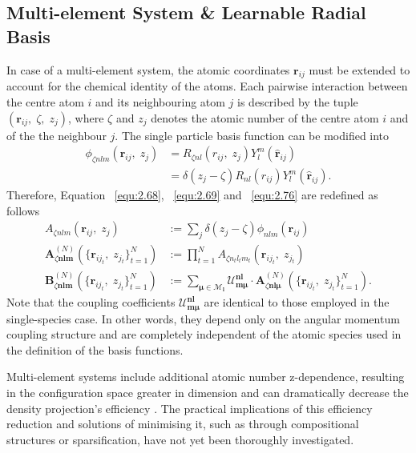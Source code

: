 \subsection{Multi-element System \& Learnable Radial Basis} \label{sec:2.5.5}
In case of a multi-element system, the atomic coordinates $\mathbf{r}_{ij}$ must be extended to account for the chemical identity of the atoms.
Each pairwise interaction between the centre atom $i$ and its neighbouring atom $j$ is described by the tuple $(\mathbf{r}_{ij},\;\zeta,\;z_{j})$, where $\zeta$ and $z_{j}$ denotes the atomic number of the centre atom $i$ and of the the neighbour $j$.
The single particle basis function can be modified into 
\begin{equation} \label{equ:2.79}
\begin{split}
\phi_{\zeta nlm}(\textbf{r}_{ij},\;z_{j})
&= R_{\zeta nl}(r_{ij},\;z_{j})Y_{l}^{m}(\hat{\textbf{r}}_{ij}) \\
&= \delta(z_{j}-\zeta)R_{nl}(r_{ij})Y_{l}^{m}(\hat{\textbf{r}}_{ij}).
\end{split}
\end{equation}
Therefore, Equation ~\eqref{equ:2.68}, ~\eqref{equ:2.69} and ~\eqref{equ:2.76} are redefined as follows
\begin{equation} \label{equ:2.80}
\begin{split}
    A_{\zeta nlm}(\textbf{r}_{ij},\;z_{j}) 
    &:=\sum_{j}\delta(z_{j}-\zeta)\phi_{nlm}(\textbf{r}_{ij})
\\
    \textbf{A}^{(N)}_{\zeta\mathbf{nlm}}(\{\mathbf{r}_{ij_{t}},\;z_{j_{t}}\}^{N}_{t=1})
    &:=\prod_{t=1}^{N}A_{\zeta n_{t}l_{t}m_{t}}(\mathbf{r}_{ij_{t}},\;z_{j_{t}}) 
\\
    \textbf{B}^{(N)}_{\zeta\mathbf{nlm}}(\{\mathbf{r}_{ij_{t}},\;z_{j_{t}}\}^{N}_{t=1}) 
    &:=\sum_{\boldsymbol{\mu}\in\mathcal{M}_{\textbf{l}}}
    \mathcal{U}^{\textbf{nl}}_{\textbf{m}\boldsymbol{\mu}}\cdot
    \textbf{A}^{(N)}_{\zeta\mathbf{nl}\boldsymbol{\mu}}(\{\mathbf{r}_{ij_{t}},\;z_{j_{t}}\}^{N}_{t=1}).
\end{split}
\end{equation}
Note that the coupling coefficients $\mathcal{U}^{\textbf{nl}}_{\textbf{m}\boldsymbol{\mu}}$ are identical to those  employed in the single-species case.
In other words, they depend only on the angular momentum coupling structure and are completely independent of the atomic species used in the definition of the basis functions.

Multi-element systems include additional atomic number z-dependence, resulting in the configuration space greater in dimension and can dramatically decrease the density projection's efficiency \cite{Darby2023}.  The practical implications of this efficiency reduction and solutions of minimising it, such as through compositional structures or sparsification, have not yet been thoroughly investigated.

